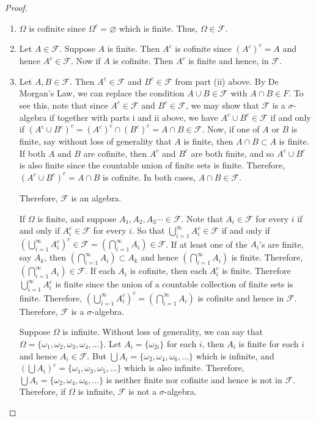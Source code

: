 \begin{proof}
\begin{enumerate}[label=\roman*.]
\item $\Omega$ is cofinite since $\Omega^c=\varnothing$ which is finite. Thus, $\Omega\in\mathcal F$.
\item Let $A\in\mathcal F$. Suppose $A$ is finite. Then $A^c$ is cofinite since $(A^c)^c=A$ and hence $A^c\in \mathcal F$. Now if $A$ is cofinite. Then $A^c$ is finite and hence, in $\mathcal F$.
\item Let $A,B\in \mathcal F$. Then $A^c\in\mathcal F$ and $B^c\in \mathcal F$ from part (ii) above. By De Morgan's Law, we can replace the condition $A\cup B\in \mathcal F$ with $A\cap B\in F$. To see this, note that since $A^c\in \mathcal F$ and $B^c\in \mathcal F$, we may show that $\mathcal F$ is a $\sigma$-algebra if together with parts i and ii above, we have $A^c\cup B^c\in \mathcal F$ if and only if $(A^c\cup B^c)^c=(A^c)^c\cap (B^c)^c=A\cap B\in\mathcal F$. Now, if one of $A$ or $B$ is finite, say without loss of generality that $A$ is finite, then $A\cap B\subset A$ is finite. If both $A$ and $B$ are cofinite, then $A^c$ and $B^c$ are both finite, and so $A^c\cup B^c$ is also finite since the countable union of finite sets is finite. Therefore, $(A^c\cup B^c)^c=A\cap B$ is cofinite. In both cases, $A\cap B\in \mathcal F$.

Therefore, $\mathcal F$ is an algebra.

If $\Omega$ is finite, and suppose $A_1, A_2, A_3\cdots \in \mathcal F$. Note that $A_i\in\mathcal F$ for every $i$ if and only if $A_i^c\in\mathcal F$ for every $i$. So that $\bigcup_{i=1}^\infty A_i^c\in \mathcal F$ if and only if $\left(\bigcup_{i=1}^\infty A_i^c\right)^c\in \mathcal F=\left(\bigcap_{i=1}^\infty A_i\right)\in \mathcal F$. If at least one of the $A_i$'s are finite, say $A_k$, then $\left(\bigcap_{i=1}^\infty A_i\right)\subset A_k$ and hence $\left(\bigcap_{i=1}^\infty A_i\right)$ is finite. Therefore, $\left(\bigcap_{i=1}^\infty A_i\right)\in \mathcal F$. If each $A_i$ is cofinite, then each $A_i^c$ is finite. Therefore $\bigcup_{i=1}^\infty A_i^c$ is finite since the union of a countable collection of finite sets is finite. Therefore, $\left(\bigcup_{i=1}^\infty A_i^c\right)^c=\left(\bigcap_{i=1}^\infty A_i\right)$ is cofinite and hence in $\mathcal F$. Therefore, $\mathcal F$ is a $\sigma$-algebra.

Suppose $\Omega$ is infinite. Without loss of generality, we can say that $\Omega=\{\omega_1,\omega_2,\omega_3,\omega_4,\ldots \}$. Let $A_i=\{\omega_{2i} \}$ for each $i$, then $A_i$ is finite for each $i$ and hence $A_i\in \mathcal F$. But $\bigcup A_i=\{\omega_{2}, \omega_4, \omega_6, \ldots \}$ which is infinite, and $\left(\bigcup A_i\right)^c=\{\omega_{1}, \omega_3, \omega_5, \ldots \}$ which is also infinite. Therefore, $\bigcup A_i=\{\omega_{2}, \omega_4, \omega_6, \ldots \}$ is neither finite nor cofinite and hence is not in $\mathcal F$. Therefore, if $\Omega$ is infinite, $\mathcal F$ is not a $\sigma$-algebra.
\end{enumerate}
\end{proof}


